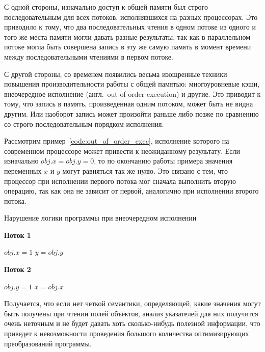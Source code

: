 \documentclass[14pt,titlepage]{extarticle}
\newcommand{\algorithmictitle}[1]{\hspace{8mm}\textbf{#1}}
\newcommand{\eng}[1]{{\English#1}}
\newcommand{\engdef}[1]{(англ.~\eng{#1})}
\begin{document}
      С одной стороны, изначально доступ к общей памяти был строго
      последовательным для всех потоков, исполнявшихся на разных процессорах.
      Это приводило к тому, что два последовательных чтения в одном потоке из
      одного и того же места памяти могли давать разные результаты, так как в
      параллельном потоке могла быть совершена запись в эту же самую память в
      момент времени между последовательными чтениями в первом потоке.

      С другой стороны, со временем появились весьма изощренные техники
      повышения производительности работы с общей памятью: многоуровневые кэши,
      внеочередное исполнение \engdef{out-of-order execution} и другие.
      Это приводит к тому, что запись в память, произведенная одним потоком,
      может быть не видна другим. Или наоборот запись может произойти раньше
      либо позже по сравнению со строго последовательным порядком исполнения.

      Рассмотрим пример~\ref{code:out_of_order_exec}, исполнение которого на
      современном процессоре может привести к неожиданному результату.
      Если изначально $obj.x = obj.y = 0$, то по окончанию работы примера
      значения переменных $x$ и $y$ могут равняться так же нулю. Это связано с
      тем, что процессор при исполнении первого потока мог сначала выполнить
      вторую операцию, так как она не зависит от первой, аналогично при
      исполнении второго потока.

      \begin{algorithm}
        \caption{Нарушение логики программы при внеочередном исполнении}
        \label{code:out_of_order_exec}
        \begin{multicols*}{2}
          \algorithmictitle{Поток 1}
          \begin{algorithmic}[1]
            \STATE $obj.x = 1$
            \STATE $y = obj.y$
          \end{algorithmic}
          \columnbreak
          \algorithmictitle{Поток 2}
          \begin{algorithmic}[1]
            \STATE $obj.y = 1$
            \STATE $x = obj.x$
          \end{algorithmic}
        \end{multicols*}
      \end{algorithm}

      Получается, что если нет четкой семантики, определяющей, какие значения
      могут быть получены при чтении полей объектов, анализ указателей для
      них получится очень неточным и не будет давать хоть сколько-нибудь
      полезной информации, что приведет к невозможности проведения большого
      количества оптимизирующих преобразований программы.
\end{document}

